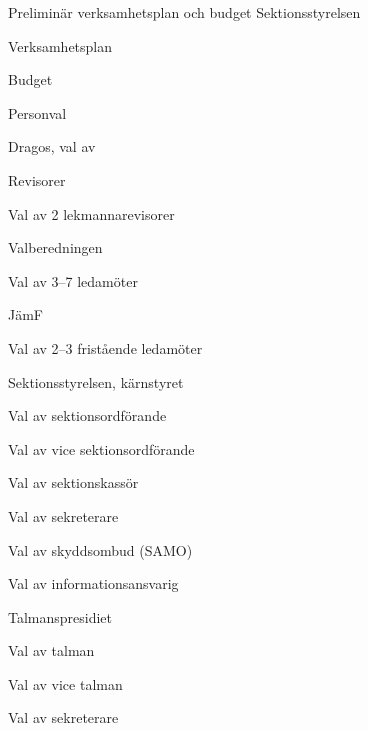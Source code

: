 \documentclass{sektionsmote}
\begin{document}
\begin{ootd}
\item{Preliminär verksamhetsplan och budget Sektionsstyrelsen}
\begin{ootd}
    \item Verksamhetsplan
    \item Budget
\end{ootd}


\item{Personval}
\begin{ootd}
    \item Dragos, val av
    \item Revisorer
    \begin{ootd}
        \item Val av 2 lekmannarevisorer
    \end{ootd}
    \item Valberedningen
    \begin{ootd}
        \item Val av 3--7 ledamöter
    \end{ootd}
    \item JämF
    \begin{ootd}
	\item Val av 2--3 fristående ledamöter
    \end{ootd}
    \item Sektionsstyrelsen, kärnstyret
    \begin{ootd}
        \item Val av sektionsordförande
        \item Val av vice sektionsordförande
        \item Val av sektionskassör
        \item Val av sekreterare
        \item Val av skyddsombud (SAMO)
        \item Val av informationsansvarig
    \end{ootd}
    \item Talmanspresidiet
    \begin{ootd}
        \item Val av talman
        \item Val av vice talman
        \item Val av sekreterare
    \end{ootd}

\end{ootd}
\end{ootd}
\end{document}
